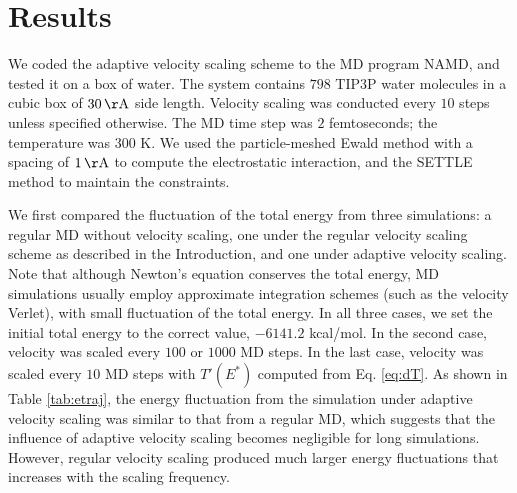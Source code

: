 \documentclass[reprint]{revtex4-1}
\begin{document}
%




\section{Results}



We coded the adaptive velocity scaling scheme to
the MD program NAMD\cite{NAMD},
and tested it on a box of water.
%
The system contains
$798$ TIP3P water molecules\cite{jorgensen1983}
in a cubic box of $30 \, \mathrm{\AA}$ side length.
%
Velocity scaling was conducted every $10$ steps
unless specified otherwise.
%
The MD time step was $2$ femtoseconds;
the temperature was $300$ K.
%
We used the particle-meshed Ewald method\cite{essmann1995}
with a spacing of $1 \, \mathrm{\AA}$
to compute the electrostatic interaction,
and the SETTLE method\cite{miyamoto1992}
to maintain the constraints.


We first compared the fluctuation of the total energy
from three simulations:
%
a regular MD without velocity scaling,
one under the regular velocity scaling scheme as described in the Introduction,
and one under adaptive velocity scaling.
%
Note that although Newton's equation conserves the total energy,
MD simulations usually employ approximate integration schemes
(such as the velocity Verlet),
with
small fluctuation of the total energy.
%
In all three cases,
we set the initial total energy to the correct value, $-6141.2$ kcal/mol.
%
In the second case,
velocity was scaled every $100$ or $1000$ MD steps.
%
In the last case,
velocity was scaled every $10$ MD steps with
$T'(E^*)$ computed from Eq. \eqref{eq:dT}.
%
As shown in Table \ref{tab:etraj},
the energy fluctuation from the simulation under adaptive velocity scaling
was similar to that from a regular MD,
which suggests that the influence of adaptive velocity scaling
becomes negligible for long simulations.
%
However, regular velocity scaling
produced much larger energy fluctuations
that increases with the scaling frequency.
\end{document}
